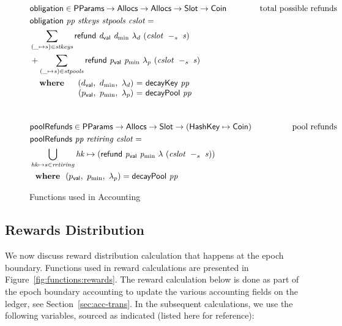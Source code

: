\begin{figure}[htb]
  \begin{align*}
      & \fun{obligation} \in \PParams \to \Allocs \to \Allocs \to \Slot \to \Coin
      & \text{total possible refunds} \\
      & \obligation{pp}{stkeys}{stpools}{cslot} =\\
      & \sum\limits_{(\_ \mapsto s) \in \var{stkeys}}
        \refund{d_{\mathsf{val}}}{d_{\min}}{\lambda_d}{(\slotminus{cslot}{s})} \\
      & + \sum\limits_{(\_ \mapsto s) \in \var{stpools}}
        \refund{p_{\mathsf{val}}}{p_{\min}}{\lambda_p}{(\slotminus{cslot}{s})} \\
      &
      \begin{array}{lr@{~=~}l}
        \where
          & (\dval,~d_{\min},~\lambda_d) & \fun{decayKey}~\var{pp}\\
          & (p_{\mathsf{val}},~p_{\min},~\lambda_p) & \fun{decayPool}~\var{pp}\\
      \end{array}\\
      \nextdef
      & \fun{poolRefunds} \in \PParams \to \Allocs \to \Slot \to (\HashKey \mapsto \Coin)
      & \text{pool refunds} \\
      & \poolRefunds{pp}{retiring}{cslot} = \\
      & \bigcup_{\var{hk}\mapsto s\in\var{retiring}}
          \var{hk}\mapsto( \refund{p_{\mathsf{val}}}{p_{\min}}{\lambda}{(\slotminus{cslot}{s})} ) \\
      &
        \where (p_{\mathsf{val}},~p_{\min},~\lambda_p) = \fun{decayPool}~\var{pp}\\
  \end{align*}
  \caption{Functions used in Accounting}
  \label{fig:functions:epoch}
\end{figure}

\subsection{Rewards Distribution}
\label{sec:reward-dist}

We now discuss reward distribution calculation that happens at the epoch boundary.
Functions used in reward calculations are presented in
Figure~\ref{fig:functions:rewards}. The reward calculation below is done as part of the
epoch boundary accounting to update the various accounting fields on the ledger,
see Section~\ref{sec:acc-trans}. In the subsequent calculations, we use the
following variables, sourced as indicated (listed here for reference):

